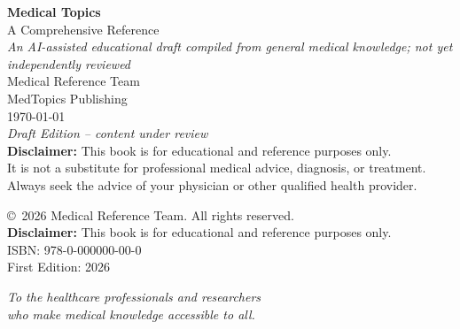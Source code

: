 \frontmatter

\begin{titlepage}
    \centering
    \vspace*{2cm}
    {\Huge \bfseries Medical Topics}\\ \vspace{0.5cm}
    {\Large A Comprehensive Reference}\\ \vspace{1.5cm}
    {\large \textit{An AI-assisted educational draft compiled from general medical knowledge; not yet independently reviewed}}\\ \vspace{2cm}
    {\large Medical Reference Team}\\ \vspace{0.5cm}
    {\normalsize MedTopics Publishing}\\ \vspace{1cm}
    {\today}\\ \vspace{2cm}
    {\small \textit{Draft Edition -- content under review}}\\
    \vfill
    {\footnotesize \textbf{Disclaimer:} This book is for educational and reference purposes only.\\
    It is not a substitute for professional medical advice, diagnosis, or treatment.\\
    Always seek the advice of your physician or other qualified health provider.}
\end{titlepage}

\newpage
\thispagestyle{empty}
\vspace*{\fill}
\noindent \copyright\ 2026 Medical Reference Team. All rights reserved.\\ \vspace{0.5cm}
\textbf{Disclaimer:} This book is for educational and reference purposes only.\\ \vspace{0.5cm}
ISBN: 978-0-000000-00-0\\ \vspace{0.5cm}
First Edition: 2026

\newpage
\thispagestyle{empty}
\vspace*{\fill}
\begin{center}
    \textit{To the healthcare professionals and researchers\\
    who make medical knowledge accessible to all.}
\end{center}
\vspace*{\fill}

